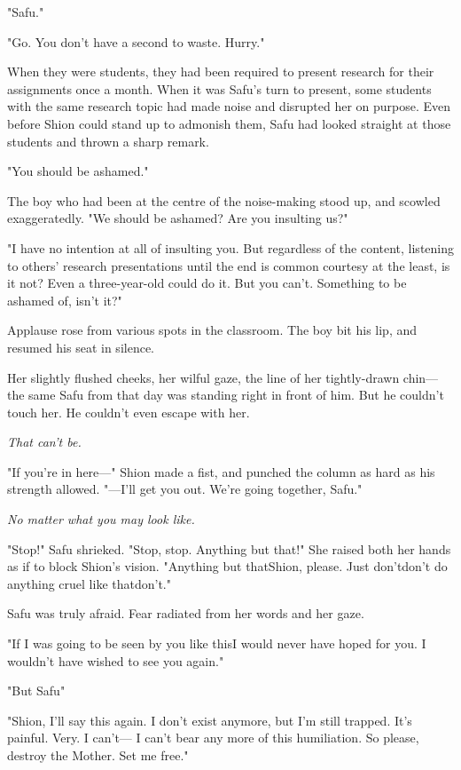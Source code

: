 "Safu."

"Go. You don't have a second to waste. Hurry."

When they were students, they had been required to present research for
their assignments once a month. When it was Safu's turn to present, some
students with the same research topic had made noise and disrupted her
on purpose. Even before Shion could stand up to admonish them, Safu had
looked straight at those students and thrown a sharp remark.

"You should be ashamed."

The boy who had been at the centre of the noise-making stood up, and
scowled exaggeratedly. "We should be ashamed? Are you insulting us?"

"I have no intention at all of insulting you. But regardless of the
content, listening to others' research presentations until the end is
common courtesy at the least, is it not? Even a three-year-old could do
it. But you can't. Something to be ashamed of, isn't it?"

Applause rose from various spots in the classroom. The boy bit his lip,
and resumed his seat in silence.

Her slightly flushed cheeks, her wilful gaze, the line of her
tightly-drawn chin---the same Safu from that day was standing right in
front of him. But he couldn't touch her. He couldn't even escape with
her.

\emph{That can't be.}

"If you're in here---" Shion made a fist, and punched the column as hard
as his strength allowed. "---I'll get you out. We're going together,
Safu."

\emph{No matter what you may look like.}

"Stop!" Safu shrieked. "Stop, stop. Anything but that!" She raised both
her hands as if to block Shion's vision. "Anything but that\el Shion,
please. Just don't\el don't do anything cruel like that\el don't."

Safu was truly afraid. Fear radiated from her words and her gaze.

"If I was going to be seen by you like this\el I would never have hoped
for you. I wouldn't have wished to see you again."

"But Safu\el "

"Shion, I'll say this again. I don't exist anymore, but I'm still
trapped. It's painful. Very. I can't--- I can't bear any more of this
humiliation. So please, destroy the Mother. Set me free."

